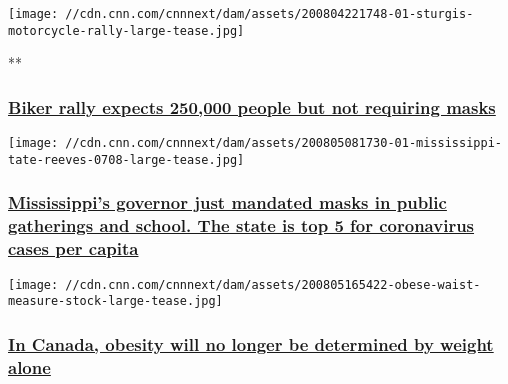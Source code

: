 \href{/videos/health/2020/08/06/sturgis-mototcycle-rally-not-requiring-masks-newday-vpx.cnn}{}

\texttt{[image: //cdn.cnn.com/cnnnext/dam/assets/200804221748-01-sturgis-motorcycle-rally-large-tease.jpg]}

**

\hypertarget{biker-rally-expects-250000-people-but-not-requiring-masks}{%
\subsubsection{\texorpdfstring{\href{/videos/health/2020/08/06/sturgis-mototcycle-rally-not-requiring-masks-newday-vpx.cnn}{Biker
rally expects 250,000 people but not requiring
masks}}{Biker rally expects 250,000 people but not requiring masks}}\label{biker-rally-expects-250000-people-but-not-requiring-masks}}

\href{/2020/08/05/health/mississippi-coronavirus-masks-schools-positivity-rate/index.html}{}

\texttt{[image: //cdn.cnn.com/cnnnext/dam/assets/200805081730-01-mississippi-tate-reeves-0708-large-tease.jpg]}

\hypertarget{mississippis-governor-just-mandated-masks-in-public-gatherings-and-school-the-state-is-top-5-for-coronavirus-cases-per-capita}{%
\subsubsection{\texorpdfstring{\href{/2020/08/05/health/mississippi-coronavirus-masks-schools-positivity-rate/index.html}{Mississippi's
governor just mandated masks in public gatherings and school. The state
is top 5 for coronavirus cases per
capita}}{Mississippi's governor just mandated masks in public gatherings and school. The state is top 5 for coronavirus cases per capita}}\label{mississippis-governor-just-mandated-masks-in-public-gatherings-and-school-the-state-is-top-5-for-coronavirus-cases-per-capita}}

\href{/2020/08/06/health/canada-obesity-guidelines-wellness-trnd/index.html}{}

\texttt{[image: //cdn.cnn.com/cnnnext/dam/assets/200805165422-obese-waist-measure-stock-large-tease.jpg]}

\hypertarget{in-canada-obesity-will-no-longer-be-determined-by-weight-alone}{%
\subsubsection{\texorpdfstring{\href{/2020/08/06/health/canada-obesity-guidelines-wellness-trnd/index.html}{In
Canada, obesity will no longer be determined by weight
alone}}{In Canada, obesity will no longer be determined by weight alone}}\label{in-canada-obesity-will-no-longer-be-determined-by-weight-alone}}

